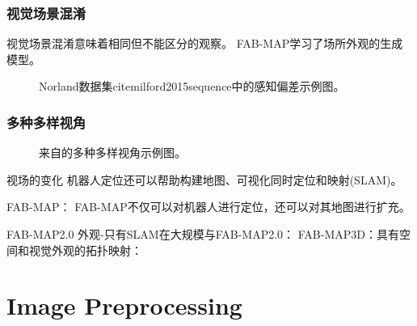 \subsubsection{视觉场景混淆}
视觉场景混淆意味着相同但不能区分的观察。 FAB-MAP学习了场所外观的生成模型。

\begin{figure*}[!t]
\centering
{}
\caption{Norland数据集cite{milford2015sequence}中的感知偏差示例图。}
\label{fig:alising}
\end{figure*}

\subsubsection{多种多样视角}

\begin{figure*}[!t]
\centering
{}
\caption{来自\cite{Philbin08}的多种多样视角示例图。}
\label{fig:alising}
\end{figure*}
视场的变化
 机器人定位还可以帮助构建地图、可视化同时定位和映射(SLAM)\cite{Cummins2011appearance}\cite{milford2012seqslam}\cite{Cummins2011Appearance}\cite{Naseer2015Robust}\cite{Davison2007MonoSLAM}\cite{Engel2014LSD}\cite{Choset2001Topological}\cite{Mur2017ORB}。

 FAB-MAP：\cite{Cummins2008FAB}
 FAB-MAP不仅可以对机器人进行定位，还可以对其地图进行扩充。


 FAB-MAP2.0\cite{Cummins2011Appearance}
 外观-只有SLAM在大规模与FAB-MAP2.0：\cite{Cummins2011Appearance}
 FAB-MAP3D：具有空间和视觉外观的拓扑映射：\cite{Paul2010FAB}

\section{Image Preprocessing}
\label{sec:preprocessing}
